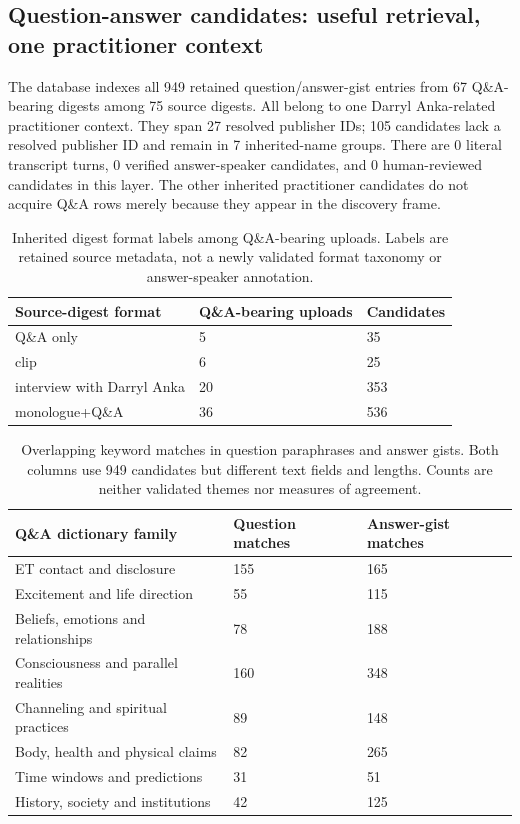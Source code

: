 \subsection{Question-answer candidates: useful retrieval, one practitioner context}

The database indexes all 949 retained question/answer-gist entries from 67 Q\&A-bearing digests among 75 source digests. All belong to one Darryl Anka-related practitioner context. They span 27 resolved publisher IDs; 105 candidates lack a resolved publisher ID and remain in 7 inherited-name groups. There are 0 literal transcript turns, 0 verified answer-speaker candidates, and 0 human-reviewed candidates in this layer. The other inherited practitioner candidates do not acquire Q\&A rows merely because they appear in the discovery frame.

\begin{table}[htbp]
\small\centering
\setlength{\tabcolsep}{4pt}
\begin{tabular}{p{}p{}p{}}
\toprule
Source-digest format & Q\&A-bearing uploads & Candidates \\ \midrule
Q\&A only & 5 & 35 \\
clip & 6 & 25 \\
interview with Darryl Anka & 20 & 353 \\
monologue+Q\&A & 36 & 536 \\
\bottomrule
\end{tabular}
\caption{Inherited digest format labels among Q\&A-bearing uploads. Labels are retained source metadata, not a newly validated format taxonomy or answer-speaker annotation.}
\end{table}


\begin{table}[htbp]
\small\centering
\setlength{\tabcolsep}{4pt}
\begin{tabular}{p{}p{}p{}}
\toprule
Q\&A dictionary family & Question matches & Answer-gist matches \\ \midrule
ET contact and disclosure & 155 & 165 \\
Excitement and life direction & 55 & 115 \\
Beliefs, emotions and relationships & 78 & 188 \\
Consciousness and parallel realities & 160 & 348 \\
Channeling and spiritual practices & 89 & 148 \\
Body, health and physical claims & 82 & 265 \\
Time windows and predictions & 31 & 51 \\
History, society and institutions & 42 & 125 \\
\bottomrule
\end{tabular}
\caption{Overlapping keyword matches in question paraphrases and answer gists. Both columns use 949 candidates but different text fields and lengths. Counts are neither validated themes nor measures of agreement.}
\end{table}


